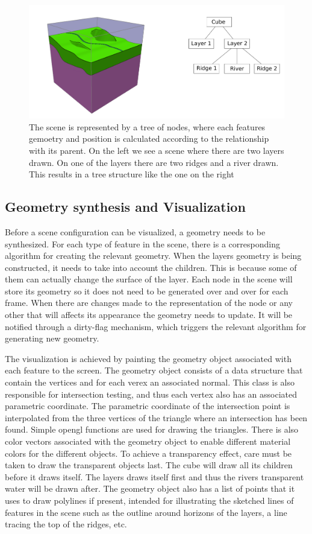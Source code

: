 \documentclass[a4paper,12pt]{report}
\begin{document}
\begin{figure}
 \includegraphics[width=\linewidth]{thesis/tree.pdf}
 \caption{The scene is represented by a tree of nodes, where each features gemoetry and position is calculated according to the relationship with its parent. On the left we see a scene where there are two layers drawn. On one of the layers there are two ridges and a river drawn. This results in a tree structure like the one on the right}
 \label{fig:tree}
\end{figure}


\subsection{Geometry synthesis and Visualization}
Before a scene configuration can be visualized, a geometry needs to be synthesized. For each type of feature in the scene, there is a corresponding algorithm for creating the relevant geometry. When the layers geometry is being constructed, it needs to take into account the children. This is because some of them can actually change the surface of the layer. Each node in the scene will store its geometry so it does not need to be generated over and over for each frame. When there are changes made to the representation of the node or any other that will affects its appearance the geometry needs to update. It will be notified through a dirty-flag mechanism, which triggers the relevant algorithm for generating new geometry.

The visualization is achieved by painting the geometry object associated with each feature to the screen. The geometry object consists of a data structure that contain the vertices and for each verex an associated normal. This class is also responsible for intersection testing, and thus each vertex also has an associated parametric coordinate. The parametric coordinate of the intersection point is interpolated from the three vertices of the triangle where an intersection has been found. Simple opengl functions are used for drawing the triangles. There is also color vectors associated with the geometry object to enable different material colors for the different objects. To achieve a transparency effect, care must be taken to draw the transparent objects last. The cube will draw all its children before it draws itself. The layers draws itself first and thus the rivers transparent water will be drawn after. The geometry object also has a list of points that it uses to draw polylines if present, intended for 
illustrating the sketched lines of features in the scene such as the outline around horizons of the layers, a line tracing the top of the ridges, etc.
\end{document}

